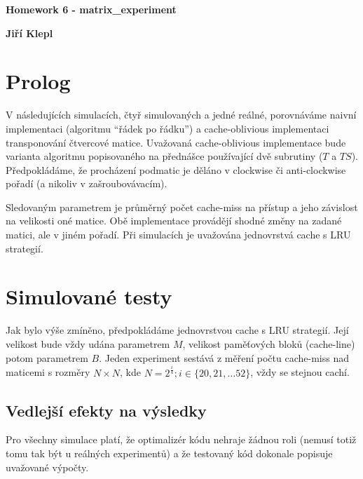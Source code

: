 \documentclass[a4paper,12pt]{article} %
\begin{document}
\thispagestyle{empty} %

\begin{center}
	{\Large \bf Homework 6 - matrix\_experiment}
	\vspace{2mm}

	{\bf Jiří Klepl}

\end{center}

\vspace{0.4cm}


\setlength{\parindent}{2em}

\section{Prolog}

V následujících simulacích, čtyř simulovaných a jedné reálné, porovnáváme naivní implementaci (algoritmu ``řádek po řádku'') a cache-oblivious implementaci transponování čtvercové matice. Uvažovaná cache-oblivious implementace bude varianta algoritmu popisovaného na přednášce používající dvě subrutiny ($T$ a $TS$). Předpokládáme, že procházení podmatic je děláno v clockwise či anti-clockwise pořadí (a nikoliv v zašroubovávacím).

Sledovaným parametrem je průměrný počet cache-miss na přístup a jeho závislost na velikosti oné matice. Obě implementace provádějí shodné změny na zadané matici, ale v jiném pořadí. Při simulacích je uvažována jednovrstvá cache s LRU strategií.

\section{Simulované testy}

Jak bylo výše zmíněno, předpokládáme jednovrstvou cache s LRU strategií. Její velikost bude vždy udána parametrem $M$, velikost paměťových bloků (cache-line) potom parametrem $B$. Jeden experiment sestává z měření počtu cache-miss nad maticemi s rozměry $N \times N$, kde $N = 2^{\frac{i}{4}}; i \in \{20, 21, \dots 52\}$, vždy se stejnou cachí.

\subsection{Vedlejší efekty na výsledky}

Pro všechny simulace platí, že optimalizér kódu nehraje žádnou roli (nemusí totiž tomu tak být u reálných experimentů) a že testovaný kód dokonale popisuje uvažované výpočty.
\end{document}
